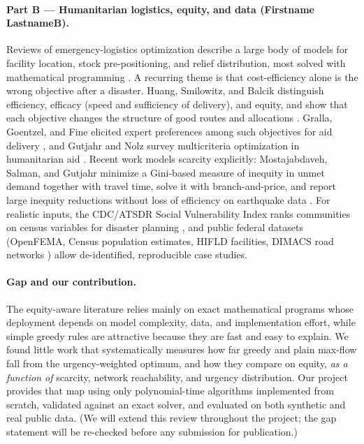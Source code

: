 \documentclass[11pt]{article}
\newcommand{\nameB}{Firstname LastnameB}
\begin{document}
\paragraph{Part B --- Humanitarian logistics, equity, and data (\nameB).}
Reviews of emergency-logistics optimization describe a large body of
models for facility location, stock pre-positioning, and relief
distribution, most solved with mathematical programming
\cite{caunhye2012}. A recurring theme is that cost-efficiency alone is the
wrong objective after a disaster. Huang, Smilowitz, and Balcik distinguish
efficiency, efficacy (speed and sufficiency of delivery), and equity, and
show that each objective changes the structure of good routes and
allocations \cite{huang2012}. Gralla, Goentzel, and Fine elicited expert
preferences among such objectives for aid delivery \cite{gralla2014}, and
Gutjahr and Nolz survey multicriteria optimization in humanitarian aid
\cite{gutjahr2016}. Recent work models scarcity explicitly:
Mostajabdaveh, Salman, and Gutjahr minimize a Gini-based measure of inequity
in unmet demand together with travel time, solve it with branch-and-price,
and report large inequity reductions without loss of efficiency on
earthquake data \cite{mostajabdaveh2025}. For realistic inputs, the
CDC/ATSDR Social Vulnerability Index ranks communities on census variables
for disaster planning \cite{flanagan2011}, and public federal datasets
(OpenFEMA, Census population estimates, HIFLD facilities, DIMACS road
networks \cite{dimacs2009}) allow de-identified, reproducible case studies.

\paragraph{Gap and our contribution.}
The equity-aware literature relies mainly on exact mathematical programs
whose deployment depends on model complexity, data, and implementation
effort, while simple greedy rules are attractive because they are fast and
easy to explain. We found little work that systematically measures how
far greedy and plain max-flow fall from the urgency-weighted optimum, and how
they compare on equity, \emph{as a function of} scarcity, network
reachability, and urgency distribution. Our project provides that map using
only polynomial-time algorithms implemented from scratch, validated against an
exact solver, and evaluated on both synthetic and real public data.
(We will extend this review throughout the project; the gap statement will
be re-checked before any submission for publication.)
\end{document}
